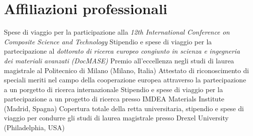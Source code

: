 \documentclass[
  a4paper, 
]{fortysecondscv}
\begin{document}
\section{Affiliazioni professionali}
\begin{cvtable}
\end{cvtable}

\newpage
\makethirdsidebar

\begin{cvtable}
		{{\small Spese di viaggio per la participazione alla \emph{\small 12th International Conference on Composite Science and Technology}}}
		{{\small Stipendio e spese di viaggio per la partecipazione al \emph{\small dottorato di ricerca europeo congiunto in scienza e ingegneria dei materiali avanzati (DocMASE)}}}
		{{\small Premio all'eccellenza negli studi di laurea magistrale al Politecnico di Milano (Milano, Italia)}}
		{{\small Attestato di riconoscimento di speciali meriti nel campo della cooperazione europea attraverso la partecipazione a un porgetto di ricerca internazionale}}
		{{\small Stipendio e spese di viaggio per la partecipazione a un progetto di ricerca presso IMDEA Materials Institute (Madrid, Spagna)}}
		{{\small Copertura totale della retta universitaria, stipendio e spese di viaggio per condurre gli studi di laurea magistrale presso Drexel University (Philadelphia, USA)}}

\end{cvtable}
\end{document}
